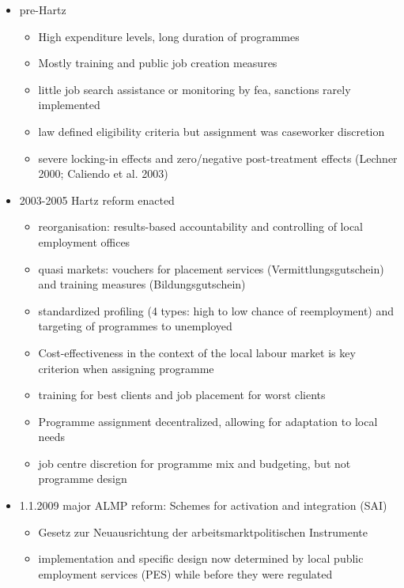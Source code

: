 \begin{itemize}
    \item pre-Hartz
    \begin{itemize}
        \item High expenditure levels, long duration of programmes \citep{jacobi2006before}
        \item Mostly training and public job creation measures 
        \item little job search assistance or monitoring by fea, sanctions rarely implemented
        \item law defined eligibility criteria but assignment was caseworker discretion \citep{jacobi2006before}
        \item severe locking-in effects and zero/negative post-treatment effects (Lechner 2000; Caliendo et al. 2003)
    \end{itemize}
    \item 2003-2005 Hartz reform enacted
    \begin{itemize}
        \item reorganisation: results-based accountability and controlling of local employment offices
        \item quasi markets: vouchers for placement services (Vermittlungsgutschein) and training measures (Bildungsgutschein)
        \item standardized profiling (4 types: high to low chance of reemployment) and targeting of programmes to unemployed
        \item Cost-effectiveness in the context of the local labour market is key criterion when assigning programme \citep{jacobi2006before} 
        \item training for best clients and job placement for worst clients \citep{jacobi2006before}
        \item Programme assignment decentralized, allowing for adaptation to local needs
        \item job centre discretion for programme mix and budgeting, but not programme design \citep{harrer2019free}
    \end{itemize}
    \item 1.1.2009 major ALMP reform: Schemes for activation and integration (SAI)
    \begin{itemize}
        \item Gesetz zur Neuausrichtung der arbeitsmarktpolitischen Instrumente
        \item implementation and specific design now determined by local public employment services (PES) while before they were regulated \citep{harrer2019free}

\end{itemize}
\end{itemize}
